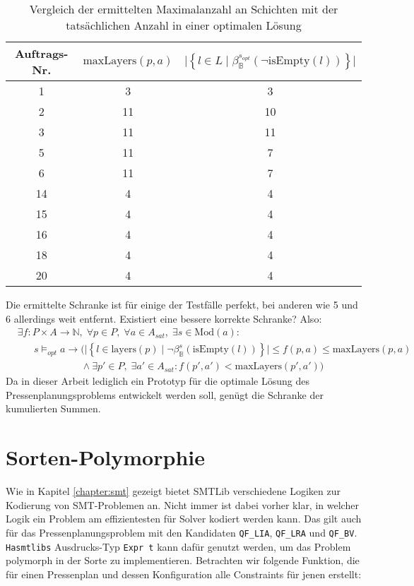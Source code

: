 \begin{table}[H]
    \centering
    \begin{tabular}{|c|c|c|}
        \hline
        Auftrags-Nr. & $\text{maxLayers}(p,a)$ & $\lvert \left\{ l \in L \mid \beta_{\mathbb{B}}^{s_{opt}}(\neg\text{isEmpty}(l)) \right\} \rvert$ \\
        \hline
        1  & 3 & 3 \\
        2  & 11 & 10 \\
        3  & 11 & 11 \\
        5  & 11 & 7 \\
        6  & 11 & 7 \\
        14 & 4 & 4 \\
        15 & 4 & 4 \\
        16 & 4 & 4 \\
        18 & 4 & 4 \\
        20 & 4 & 4 \\
        \hline
    \end{tabular}
    \caption{Vergleich der ermittelten Maximalanzahl an Schichten mit der tatsächlichen Anzahl in einer optimalen Lösung}
    \label{table:vglvvoptschranke}
\end{table}
Die ermittelte Schranke ist für einige der Testfälle perfekt, bei anderen wie 5 und 6 allerdings weit entfernt.
Existiert eine bessere korrekte Schranke?
Also:
\begin{align*}
    &\hspace{0pt} \exists f: P \times A \rightarrow \mathbb{N}, \; \forall p \in P, \; \forall a \in A_{sat}, \; \exists s \in \text{Mod}(a): \\
    &\hspace{20pt} s \models_{opt} a \rightarrow (\lvert \left\{ l \in \text{layers}(p) \mid \neg \beta_{\mathbb{B}}^{s}(\text{isEmpty}(l)) \right\} \rvert \leq f(p,a) \leq \text{maxLayers}(p,a) \\
    &\hspace{77pt} \land \exists p\prime \in P, \; \exists a\prime \in A_{sat}: f(p\prime,a\prime) < \text{maxLayers}(p\prime,a\prime))
\end{align*}
Da in dieser Arbeit lediglich ein Prototyp für die optimale Lösung des Pressenplanungsproblems entwickelt werden soll, genügt die Schranke der kumulierten Summen.

\section{Sorten-Polymorphie}
\label{sec:sortpoly}
Wie in Kapitel \ref{chapter:smt} gezeigt bietet SMTLib verschiedene Logiken zur Kodierung von SMT-Problemen an.
Nicht immer ist dabei vorher klar, in welcher Logik ein Problem am effizientesten für Solver kodiert werden kann.
Das gilt auch für das Pressenplanungsproblem mit den Kandidaten \texttt{QF\_LIA}, \texttt{QF\_LRA} und \texttt{QF\_BV}.
\texttt{Hasmtlibs} Ausdrucks-Typ \texttt{Expr t} kann dafür genutzt werden, um das Problem polymorph in der Sorte zu implementieren.
Betrachten wir folgende Funktion, die für einen Pressenplan und dessen Konfiguration alle Constraints für jenen erstellt:

